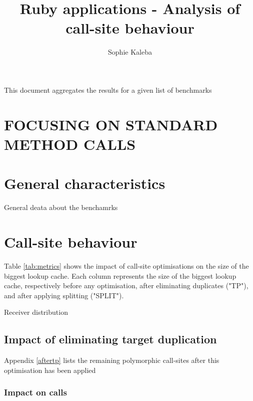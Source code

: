 \documentclass[10pt, sigplan, preprint]{acmart}
\begin{document}
\title{Ruby applications - Analysis of call-site behaviour}

\author{Sophie Kaleba}

\maketitle

This document aggregates the results for a given list of benchmarks

\section{FOCUSING ON STANDARD METHOD CALLS}

\section{General characteristics}

\begin{table}[!h]
	\caption{General deata about the benchamrks}
	\centering
	\tiny
	\Metrics
	\label{tab:metrics}
	\end{table}

\section{Call-site behaviour}

Table \ref{tab:metrics} shows the impact of call-site optimisations on the size of the biggest lookup cache.
Each column represents the size of the biggest lookup cache, respectively before any optimisation, after eliminating duplicates ("TP"), and after applying splitting ("SPLIT").

\begin{table}[!h]
	\caption{Receiver distribution}
	\centering
	\tiny
	\Distribution
	\label{tab:distribution}
\end{table}
	
\subsection{Impact of eliminating target duplication}

Appendix \ref{aftertp} lists the remaining polymorphic call-sites after this optimisation has been applied

\subsubsection{\textbf{Impact on calls}}
\end{document}
